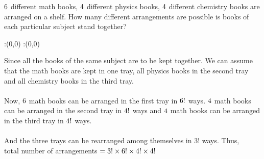 



\question[4] $6$ different math books, $4$ different physics books, $4$ different chemistry books are arranged on a shelf. How many different arrangements are possible is books of each particular subject stand together?   


\watchout

\ifprintanswers
  \begin{marginfigure}
      :(0,0)
      :(0,0)
    \figdrawbegin{}
      \figdrawline [100,101]
    \figdrawend
    \figvisu{\figBoxA}{}{%
    }
    \centerline{\box\figBoxA}
  \end{marginfigure}
\fi 

\begin{solution}[\halfpage]
Since all the books of the same  subject are to be kept together. We can assume that the math books are kept in one tray, all physics books in the second tray and all chemistry books in the third tray.\\
\\ 
Now, $6$ math books can be arranged in the first tray in $6!$ ways. $4$ math books can be arranged in the second tray in $4!$ ways and $4$ math books can be arranged in the third tray in $4!$ ways.\\
\\
And the three trays can be rearranged among themselves in $3!$ ways. Thus,\\
total number of arrangements $= 3! \times 6! \times 4! \times 4! $
\end{solution}


